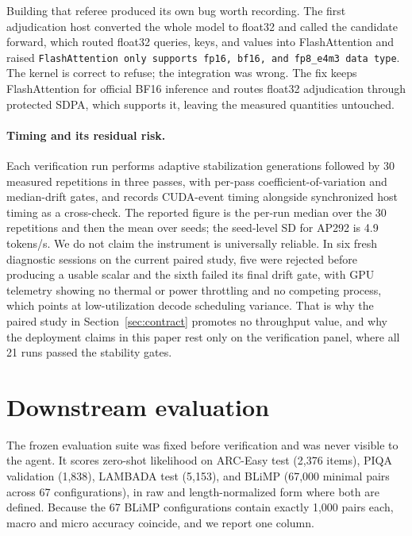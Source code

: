\documentclass{article}
\begin{document}
Building that referee produced its own bug worth recording. The first adjudication host converted the whole model to float32 and called the candidate forward, which routed float32 queries, keys, and values into FlashAttention and raised \texttt{FlashAttention only supports fp16, bf16, and fp8\_e4m3 data type}. The kernel is correct to refuse; the integration was wrong. The fix keeps FlashAttention for official BF16 inference and routes float32 adjudication through protected SDPA, which supports it, leaving the measured quantities untouched.

\paragraph{Timing and its residual risk.} Each verification run performs adaptive stabilization generations followed by 30 measured repetitions in three passes, with per-pass coefficient-of-variation and median-drift gates, and records CUDA-event timing alongside synchronized host timing as a cross-check. The reported figure is the per-run median over the 30 repetitions and then the mean over seeds; the seed-level SD for AP292 is 4.9 tokens/s. We do not claim the instrument is universally reliable. In six fresh diagnostic sessions on the current paired study, five were rejected before producing a usable scalar and the sixth failed its final drift gate, with GPU telemetry showing no thermal or power throttling and no competing process, which points at low-utilization decode scheduling variance. That is why the paired study in Section~\ref{sec:contract} promotes no throughput value, and why the deployment claims in this paper rest only on the verification panel, where all 21 runs passed the stability gates.

\section{Downstream evaluation}\label{sec:downstream}
The frozen evaluation suite was fixed before verification and was never visible to the agent. It scores zero-shot likelihood on ARC-Easy test (2,376 items), PIQA validation (1,838), LAMBADA test (5,153), and BLiMP (67,000 minimal pairs across 67 configurations), in raw and length-normalized form where both are defined. Because the 67 BLiMP configurations contain exactly 1,000 pairs each, macro and micro accuracy coincide, and we report one column.

\begin{table}[t]
\caption{Complete frozen downstream suite after matched-exposure retraining. Entries are mean $\pm$ sample standard deviation over seeds 3, 4, and 5. Accuracies are percentages and LAMBADA perplexity is lower-is-better; held-out BPB for the same runs is in Table~\ref{tab:main}. Most between-recipe differences are comparable to or smaller than the seed-level variation, and we make no significance claim.}\label{tab:downstream}
\centering\footnotesize\setlength{\tabcolsep}{4pt}
\end{table}
\end{document}
